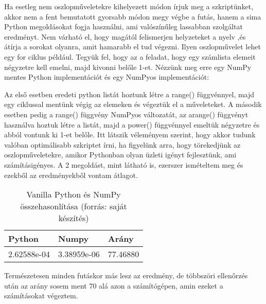 \documentclass{article}
\theoremstyle{definition}
\theoremstyle{theorem}
\begin{document}
Ha esetleg nem oszlopműveletekre kihelyezett módon írjuk meg a szkriptünket, akkor nem a fent bemutatott gyorsabb módon megy végbe a futás, hanem a sima Python megoldásokat fogja használni, ami valószínűleg lassabban szolgáltat eredményt. Nem várható el, hogy magától felismerjen helyzeteket a nyelv ,és átírja a sorokat olyanra, amit hamarabb el tud végezni.\newline
Ilyen oszlopművelet lehet egy for ciklus például. Tegyük fel, hogy az a feladat, hogy egy számlista elemeit négyzetre kell emelni, majd kivonni belőle 1-et. Nézzünk meg erre egy NumPy mentes Python implementációt és egy NumPyos implementációt:
\pagebreak

Az első esetben eredeti python listát hoztunk létre a range() függvénnyel, majd egy ciklussal mentünk végig az elemeken és végeztük el a műveleteket. A második esetben pedig a range() függvény NumPyos változatát, az arange() függvényt használva hoztuk létre a listát, majd a power() függvénnyel emeltük négyzetre és abból vontunk ki 1-et belőle. Itt látszik véleményem szerint, hogy akkor tudunk valóban optimálisabb szkriptet írni, ha figyelünk arra, hogy törekedjünk az oszlopműveletekre, amikor Pythonban olyan üzleti igényt fejlesztünk, ami számításigényes.\newline
A 2 megoldást, mint látható is, ezerszer ismételtem meg és ezekből az eredményekből vontam átlagot.\newline


\begin{table}[H]
\caption{Vanilla Python és NumPy összehasonlítása (forrás: saját készítés)}
\centering
\begin{tabular}{|l|l|l|}
\hline
Python      & Numpy       & Arány    \\ \hline
2.62588e-04 & 3.38959e-06 & 77.46880 \\ \hline
\end{tabular}
\end{table}
Természetesen minden futáskor más lesz az eredmény, de többszöri ellenőrzés után az arány sosem ment 70 alá azon a számítógépen, amin ezeket a számításokat végeztem.
\end{document}
